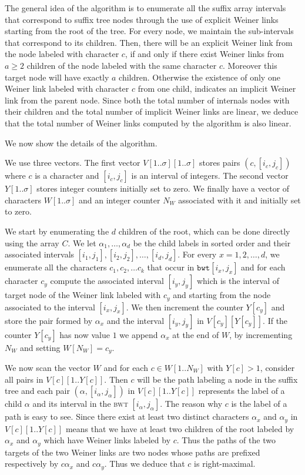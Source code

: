 \documentclass[a4paper]{article}
\begin{document}
The general idea of the algorithm is to enumerate all the suffix array intervals that correspond
to suffix tree nodes through the use of explicit Weiner links starting 
from the root of the tree. For every node, we maintain the sub-intervals that correspond 
to its children. Then, there will be an explicit Weiner link from the node labeled 
with character $c$, if and only 
if there exist Weiner links from $a\geq 2$ children of the node
labeled with the same character $c$. Moreover this target node will have 
exactly $a$ children. 
Otherwise the existence of only one Weiner link labeled with character $c$ from one child, 
indicates an implicit Weiner link from the parent node. Since both the total number of internals nodes 
with their children and the total number of implicit Weiner links are linear, we deduce that the 
total number of Weiner links computed by the algorithm is also linear. 

We now show the details of the algorithm. 




We use three vectors. The first vector $V[1..\sigma][1..\sigma]$
stores pairs $(c,[i_c,j_c])$ where $c$ is a character and $[i_c,j_c]$
is an interval of integers. The second vector $Y[1..\sigma]$ stores integer counters
initially set to zero. We finally have a vector of characters $W[1..\sigma]$ and 
an integer counter $N_W$ associated with it and initially set to zero. 

We start by enumerating the $d$ children of the root, which 
can be done directly using the array $C$. We let $\alpha_1,\ldots,\alpha_d$
be the child labels in sorted order and their associated 
intervals $[i_1,j_1],[i_2,j_2],\ldots,[i_d,j_d]$. For every $x=1,2,\ldots,d$, 
we enumerate all the characters $c_1,c_2,\ldots c_k$ that occur in $\mathtt{bwt}[i_x,j_x]$ and 
for each character $c_y$ compute the associated interval $[i_y,j_y]$ which is the 
interval of target node of the Weiner link labeled with $c_y$ 
and starting from the node associated to the interval $[i_x,j_x]$. 
We then increment the counter $Y[c_y]$
and store the pair formed by $\alpha_x$ and the interval $[i_y,j_y]$ in $V[c_y][Y[c_y]]$. 
If the counter $Y[c_y]$ has now value $1$ we append $\alpha_x$ 
at the end of $W$, by
incrementing $N_W$ and setting $W[N_W]=c_y$. 

We now scan the vector $W$ and for each $c\in W[1..N_W]$ with $Y[c]>1$,
consider all pairs in $V[c][1..Y[c]]$. Then $c$ will be the path 
labeling a node in the suffix tree and each pair $(\alpha,[i_\alpha,j_\alpha])$
in $V[c][1..Y[c]]$ represents the label of a child $\alpha$ 
and its interval in the \textsc{bwt} $[i_\alpha,j_\alpha]$. The reason why $c$ 
is the label of a path is easy to see. Since there exist at least two distinct characters $\alpha_x$
and $\alpha_y$ in  $V[c][1..Y[c]]$ means that we have at least two children 
of the root labeled by $\alpha_x$ and $\alpha_y$ which have Weiner links labeled by $c$. 
Thus the paths of the two targets of the two Weiner links are two nodes whose paths are prefixed 
respectively by $c\alpha_x$ and $c\alpha_y$. Thus we deduce that $c$ is right-maximal. 
\end{document}
